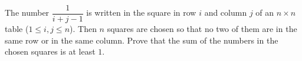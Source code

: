 The number $\dfrac{1}{i+j-1}$ is written in the square in row $i$ and column $j$ of an $n\times n$ table ($1\le i,j\le n$). Then $n$ squares are chosen so that no two of them are in the same row or in the same column. Prove that the sum of the numbers in the chosen squares is at least $1$.
